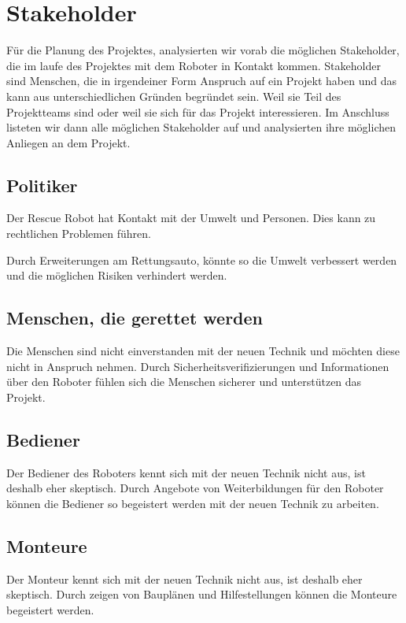 \section{Stakeholder}
Für die Planung des Projektes, analysierten wir vorab die möglichen Stakeholder, die im laufe des Projektes mit dem Roboter in Kontakt kommen.
Stakeholder sind Menschen, die in irgendeiner Form Anspruch auf ein Projekt haben und das kann aus unterschiedlichen Gründen begründet sein.
Weil sie Teil des Projektteams sind oder weil sie sich für das Projekt interessieren.
Im Anschluss listeten wir dann alle möglichen Stakeholder auf und analysierten ihre möglichen Anliegen an dem Projekt.

\subsection{Politiker}
Der Rescue Robot hat Kontakt mit der Umwelt und Personen. 
Dies kann zu rechtlichen Problemen führen. 

Durch Erweiterungen am Rettungsauto, könnte so die Umwelt verbessert
werden und die möglichen Risiken verhindert werden.

\subsection{Menschen, die gerettet werden}
Die Menschen sind nicht einverstanden mit der neuen Technik und möchten diese nicht in Anspruch nehmen.
Durch Sicherheitsverifizierungen und Informationen über den Roboter fühlen sich die Menschen sicherer und unterstützen das Projekt.

\subsection{Bediener}
Der Bediener des Roboters kennt sich mit der neuen Technik nicht aus, ist deshalb eher skeptisch.
Durch Angebote von Weiterbildungen für den Roboter können die Bediener so begeistert werden mit der neuen Technik zu arbeiten.

\subsection{Monteure}
Der Monteur kennt sich mit der neuen Technik nicht aus, ist deshalb eher skeptisch.
Durch zeigen von Bauplänen und Hilfestellungen können die Monteure begeistert werden.